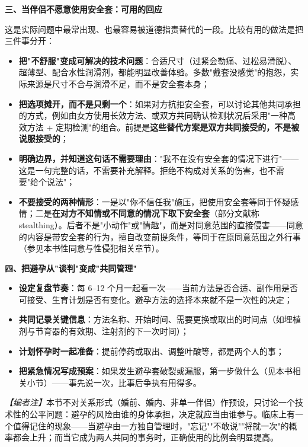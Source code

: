 \textbf{三、当伴侣不愿意使用安全套：可用的回应}

这是实际问题中最常出现、也最容易被道德指责替代的一段。比较有用的做法是把三件事分开：

\begin{itemize}
\item \textbf{把"不舒服"变成可解决的技术问题}：合适尺寸（过紧会勒痛、过松易滑脱）、超薄型、配合水性润滑剂，都能明显改善体验。多数"戴套没感觉"的抱怨，实际来源是尺寸不合与润滑不足，而不是安全套本身；
\item \textbf{把选项摊开，而不是只剩一个}：如果对方抗拒安全套，可以讨论其他共同承担的方式，例如由女方使用长效方法、或双方共同确认检测状况后采用"一种高效方法 + 定期检测"的组合。前提是\textbf{这些替代方案是双方共同接受的，不是被说服接受的}；
\item \textbf{明确边界，并知道这句话不需要理由}："我不在没有安全套的情况下进行"——这是一句完整的话，不需要补充解释。拒绝不构成对关系的伤害，也不需要"给个说法"；
\item \textbf{不要接受的两种情形}：一是以"你不信任我"施压，把使用安全套等同于怀疑感情；二是\textbf{在对方不知情或不同意的情况下取下安全套}（部分文献称 stealthing）。后者不是"小动作"或"情趣"，而是对同意范围的直接侵害——同意的内容是带安全套的行为，擅自改变前提条件，等同于在原同意范围之外行事（参见本书性同意与性侵犯相关章节）。
\end{itemize}

\textbf{四、把避孕从"谈判"变成"共同管理"}

\begin{itemize}
\item \textbf{设定复盘节奏}：每 6--12 个月一起看一次——当前方法是否合适、副作用是否可接受、生育计划是否有变化。避孕方法的选择本来就不是一次性的决定；
\item \textbf{共同记录关键信息}：方法名称、开始时间、需要更换或取出的时间点（如埋植剂与节育器的有效期、注射剂的下一次时间）；
\item \textbf{计划怀孕时一起准备}：提前停药或取出、调整叶酸等，都是两个人的事；
\item \textbf{把紧急情况写成预案}：如果发生避孕套破裂或漏服，第一步做什么（见本书相关小节）——事先说一次，比事后争执有用得多。
\end{itemize}

\textit{【编者注】}本节不对关系形式（婚前、婚内、非单一伴侣）作预设，只讨论一个技术性的公平问题：避孕的风险由谁的身体承担，决定就应当由谁参与。临床上有一个值得记住的现象——当避孕由一方独自管理时，"忘记""不敢说""将就一次"的概率都会上升；而当它成为两人共同的事务时，正确使用的比例会明显提高。

